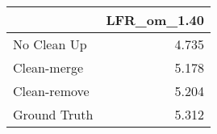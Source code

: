 \begin{tabular}{lr}
\toprule
{} & LFR_om_1.40 \\
\midrule
No Clean Up  &       4.735 \\
Clean-merge  &       5.178 \\
Clean-remove &       5.204 \\
Ground Truth &       5.312 \\
\bottomrule
\end{tabular}
